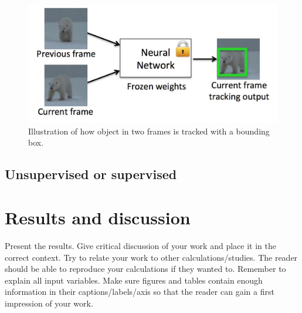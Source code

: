 \documentclass[english, a4paper]{report}
\begin{document}
\begin{figure}[H]
\begin{center}
 \includegraphics[width=\textwidth]{object-tracking.jpg}
 \caption{Illustration of how object in two frames is tracked with a bounding box. \cite{GOTURNDeep} }
 \label{fig:object-tracking}
 \end{center}
\end{figure}
 

\subsection{Unsupervised or supervised}





\section{Results and discussion}
Present the results. Give critical discussion of your work and place it in the correct context. Try to relate your work to other calculations/studies. The reader should be able to reproduce your calculations if they wanted to. Remember to explain all input variables. Make sure figures and tables contain enough information in their captions/labels/axis so that the reader can gain a first impression of your work.





\newpage


\end{document}
